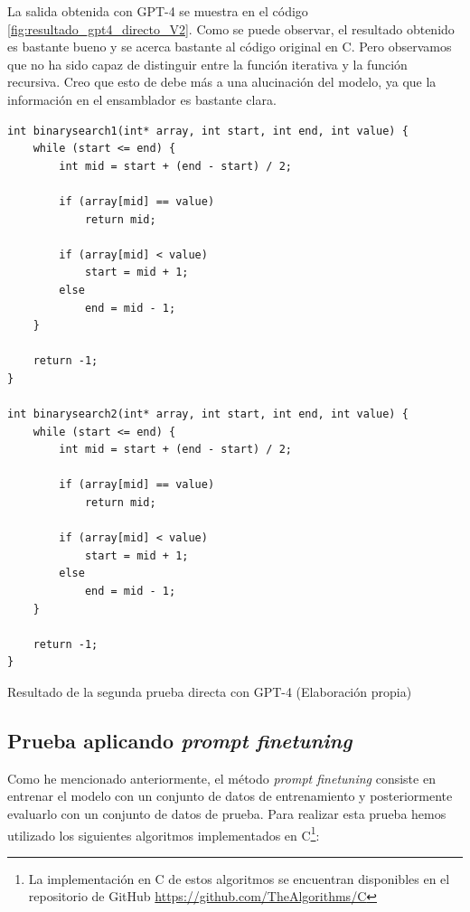 La salida obtenida con GPT-4 se muestra en el código \ref{fig:resultado_gpt4_directo_V2}.
Como se puede observar, el resultado obtenido es bastante bueno y se acerca bastante al
código original en C. Pero observamos que no ha sido capaz de distinguir entre la función
iterativa y la función recursiva. Creo que esto de debe más a una alucinación del modelo,
ya que la información en el ensamblador es bastante clara.

\begin{mycode}
    \begin{verbatim}
int binarysearch1(int* array, int start, int end, int value) {
    while (start <= end) {
        int mid = start + (end - start) / 2;

        if (array[mid] == value)
            return mid;

        if (array[mid] < value)
            start = mid + 1;
        else
            end = mid - 1;
    }

    return -1;
}

int binarysearch2(int* array, int start, int end, int value) {
    while (start <= end) {
        int mid = start + (end - start) / 2;

        if (array[mid] == value)
            return mid;

        if (array[mid] < value)
            start = mid + 1;
        else
            end = mid - 1;
    }

    return -1;
}       
    \end{verbatim}
    \caption[Resultado de la segunda prueba directa con GPT-4]{Resultado de la segunda prueba directa con GPT-4 (Elaboración propia)}
    \label{cod:resultado_gpt4_directo_V2}
\end{mycode}

\subsection{Prueba aplicando \textit{prompt finetuning}}
\label{subsec:prueba_prompt_finetuning}


Como he mencionado anteriormente, el método \textit{prompt finetuning} consiste en entrenar
el modelo con un conjunto de datos de entrenamiento y posteriormente evaluarlo con un conjunto
de datos de prueba. Para realizar esta prueba hemos utilizado los siguientes algoritmos implementados
en C\footnote{La implementación en C de estos algoritmos se encuentran disponibles en el repositorio de GitHub
\url{https://github.com/TheAlgorithms/C}}:

